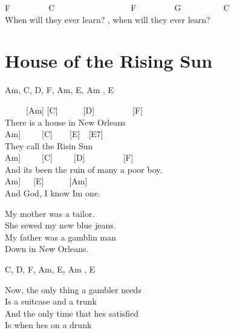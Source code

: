 \documentclass[
  letterpaper,
  a5paper]{memoir}
\begin{document}
F~~~~~~~~~C~~~~~~~~~~~~~~~~~~F~~~~~~~~~G~~~~~~~~~~C\\
When will they ever learn? , when will they ever learn?

\hypertarget{house-of-the-rising-sun}{%
\chapter{House of the Rising Sun}\label{house-of-the-rising-sun}}

Am, C, D, F, Am, E, Am , E

~~~~~{[}Am{]} {[}C{]}~~~~~~{[}D{]}~~~~~~~~~{[}F{]}\\
There is a house in New Orleans\\
\hspace*{0.333em}\hspace*{0.333em}\hspace*{0.333em}\hspace*{0.333em}{[}Am{]}~~~~~{[}C{]}~~~~{[}E{]}~~{[}E7{]}\\
They call the Risin\textquotesingle{} Sun\\
\hspace*{0.333em}\hspace*{0.333em}\hspace*{0.333em}\hspace*{0.333em}\hspace*{0.333em}\hspace*{0.333em}\hspace*{0.333em}\hspace*{0.333em}{[}Am{]}~~~~~{[}C{]}~~~~~{[}D{]}~~~~~~~~~{[}F{]}\\
And it\textquotesingle s been the ruin of many a poor boy.\\
\hspace*{0.333em}\hspace*{0.333em}\hspace*{0.333em}{[}Am{]}~~~{[}E{]}~~~~~~{[}Am{]}\\
And God, I know I\textquotesingle m one.

My mother was a tailor.\\
She sewed my new blue jeans.\\
My father was a gamblin\textquotesingle{} man\\
Down in New Orleans.

C, D, F, Am, E, Am , E

Now, the only thing a gambler needs\\
Is a suitcase and a trunk\\
And the only time that he\textquotesingle s satisfied\\
Is when he\textquotesingle s on a drunk
\end{document}
